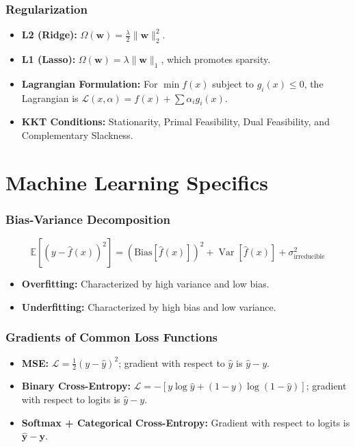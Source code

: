 \documentclass[11pt]{article}
\DeclareMathOperator{\Var}{Var}
\begin{document}
\section{Regularization}
\begin{itemize}
    \item \textbf{L2 (Ridge):} \( \Omega(\mathbf{w}) = \frac{\lambda}{2} \|\mathbf{w}\|_2^2 \).
    \item \textbf{L1 (Lasso):} \( \Omega(\mathbf{w}) = \lambda \|\mathbf{w}\|_1 \), which promotes sparsity.
    \item \textbf{Lagrangian Formulation:} For \(\min f(x)\) subject to \( g_i(x) \le 0 \), the Lagrangian is \( \mathcal{L}(x, \alpha) = f(x) + \sum \alpha_i g_i(x) \).
    \item \textbf{KKT Conditions:} Stationarity, Primal Feasibility, Dual Feasibility, and Complementary Slackness.
\end{itemize}

\hrulefill

\part{Machine Learning Specifics}

\section{Bias-Variance Decomposition}
\[
 \mathbb{E}[(y - \hat{f}(x))^2] = (\text{Bias}[\hat{f}(x)])^2 + \Var[\hat{f}(x)] + \sigma^2_{\text{irreducible}} 
\]
\begin{itemize}
    \item \textbf{Overfitting:} Characterized by high variance and low bias.
    \item \textbf{Underfitting:} Characterized by high bias and low variance.
\end{itemize}

\section{Gradients of Common Loss Functions}
\begin{itemize}
    \item \textbf{MSE:} \( \mathcal{L} = \frac{1}{2}(y - \hat{y})^2 \); gradient with respect to \(\hat{y}\) is \( \hat{y} - y \).
    \item \textbf{Binary Cross-Entropy:} \( \mathcal{L} = -[y \log \hat{y} + (1-y)\log(1-\hat{y})] \); gradient with respect to logits is \( \hat{y} - y \).
    \item \textbf{Softmax + Categorical Cross-Entropy:} Gradient with respect to logits is \( \hat{\mathbf{y}} - \mathbf{y} \).
\end{itemize}
\end{document}
